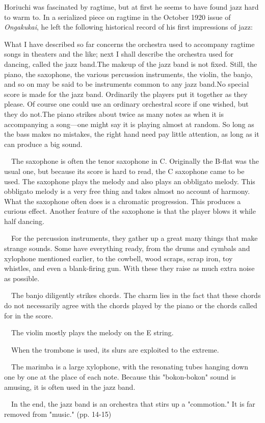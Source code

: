 Horiuchi was fascinated by ragtime, but at first he seems to have found jazz hard to warm to. In a serialized piece on ragtime in the October 1920 issue of \textit{Ongakukai}, he left the following historical record of his first impressions of jazz:

\begin{gquote}
What I have described so far concerns the orchestra used to accompany ragtime songs in theaters and the like; next I shall describe the orchestra used for dancing, called the jazz band.The makeup of the jazz band is not fixed. Still, the piano, the saxophone, the various percussion instruments, the violin, the banjo, and so on may be said to be instruments common to any jazz band.No special score is made for the jazz band. Ordinarily the players put it together as they please. Of course one could use an ordinary orchestral score if one wished, but they do not.The piano strikes about twice as many notes as when it is accompanying a song—one might say it is playing almost at random. So long as the bass makes no mistakes, the right hand need pay little attention, as long as it can produce a big sound.\par{}　The saxophone is often the tenor saxophone in C. Originally the B-flat was the usual one, but because its score is hard to read, the C saxophone came to be used. The saxophone plays the melody and also plays an obbligato melody. This obbligato melody is a very free thing and takes almost no account of harmony. What the saxophone often does is a chromatic progression. This produces a curious effect. Another feature of the saxophone is that the player blows it while half dancing.\par{}　For the percussion instruments, they gather up a great many things that make strange sounds. Some have everything ready, from the drums and cymbals and xylophone mentioned earlier, to the cowbell, wood scraps, scrap iron, toy whistles, and even a blank-firing gun. With these they raise as much extra noise as possible.\par{}　The banjo diligently strikes chords. The charm lies in the fact that these chords do not necessarily agree with the chords played by the piano or the chords called for in the score.\par{}　The violin mostly plays the melody on the E string.\par{}　When the trombone is used, its slurs are exploited to the extreme.\par{}　The marimba is a large xylophone, with the resonating tubes hanging down one by one at the place of each note. Because this "bokon-bokon" sound is amusing, it is often used in the jazz band.\par{}　In the end, the jazz band is an orchestra that stirs up a "commotion." It is far removed from "music." (pp. 14-15)
\end{gquote}

